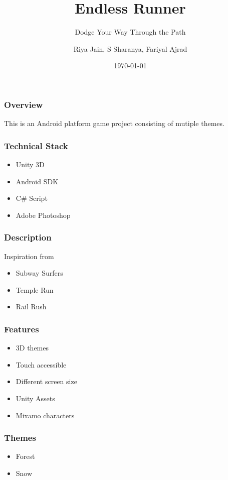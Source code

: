 \documentclass[14pt]{beamer}
\title{Endless Runner}
\subtitle{Dodge Your Way Through the Path}
\author[Team 3]{Riya Jain, S Sharanya, Fariyal Ajrad}
\date{\today}
\begin{document}
     

\begin{frame}
    \titlepage
\end{frame}

\begin{frame}   
    \frametitle{Overview}      
    This is an Android platform game project consisting of mutiple themes.
\end{frame}

\begin{frame}
    \frametitle{Technical Stack}
    \begin{itemize}
    \item Unity 3D
    \item Android SDK
    \item C\# Script
    \item Adobe Photoshop
    \end{itemize}
\end{frame}

\begin{frame}
    \frametitle{Description}
    Inspiration from 
    \begin{itemize}
    \item Subway Surfers
    \item Temple Run
    \item Rail Rush
    \end{itemize}
\end{frame}

\begin{frame}
    \frametitle{Features}
    \begin{itemize}
    \item 3D themes
    \item Touch accessible
    \item Different screen size
    \item Unity Assets 
    \item Mixamo characters
    \end{itemize}
\end{frame}

\begin{frame}
    \frametitle{Themes}
    \begin{itemize}
    \item Forest
    \item Snow
    \end{itemize}
\end{frame}
\end{document}
